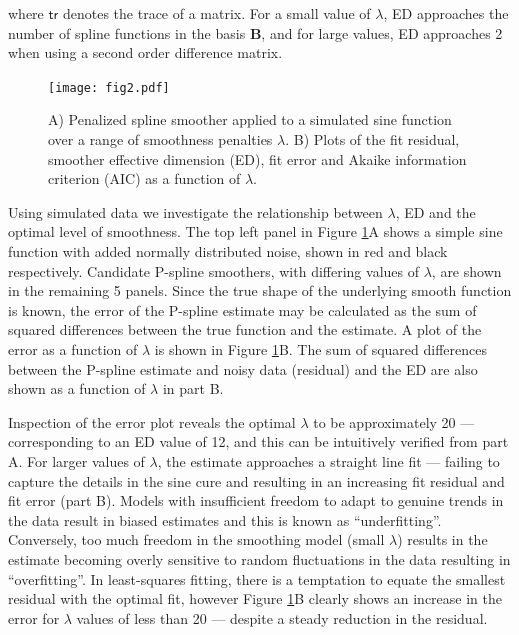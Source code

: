 \documentclass[num-refs]{wiley-article}
\begin{document}
where $\textsf{tr}$ denotes the trace of a matrix. For a small value of $\lambda$, ED approaches the number of spline functions in the basis $\mathbf{B}$, and for large values, ED approaches 2 when using a second order difference matrix.

\begin{figure}
  \begin{center}
    \texttt{[image: fig2.pdf]}
    \caption{A) Penalized spline smoother applied to a simulated sine function over a range of smoothness penalties $\lambda$. B) Plots of the fit residual, smoother effective dimension (ED), fit error and Akaike information criterion (AIC) as a function of $\lambda$.}
    \label{pspline_error}
  \end{center}
\end{figure}

Using simulated data we investigate the relationship between $\lambda$, ED and the optimal level of smoothness. The top left panel in Figure \ref{pspline_error}A shows a simple sine function with added normally distributed noise, shown in red and black respectively. Candidate P-spline smoothers, with differing values of $\lambda$, are shown in the remaining 5 panels. Since the true shape of the underlying smooth function is known, the error of the P-spline estimate may be calculated as the sum of squared differences between the true function and the estimate. A plot of the error as a function of $\lambda$ is shown in Figure \ref{pspline_error}B. The sum of squared differences between the P-spline estimate and noisy data (residual) and the ED are also shown as a function of $\lambda$ in part B.

Inspection of the error plot reveals the optimal $\lambda$ to be approximately 20 --- corresponding to an ED value of 12, and this can be intuitively verified from part A. For larger values of $\lambda$, the estimate approaches a straight line fit --- failing to capture the details in the sine cure and resulting in an increasing fit residual and fit error (part B). Models with insufficient freedom to adapt to genuine trends in the data result in biased estimates and this is known as ``underfitting''. Conversely, too much freedom in the smoothing model (small $\lambda$) results in the estimate becoming overly sensitive to random fluctuations in the data resulting in ``overfitting''. In least-squares fitting, there is a temptation to equate the smallest residual with the optimal fit, however Figure \ref{pspline_error}B clearly shows an increase in the error for $\lambda$ values of less than 20 --- despite a steady reduction in the residual.
\end{document}
